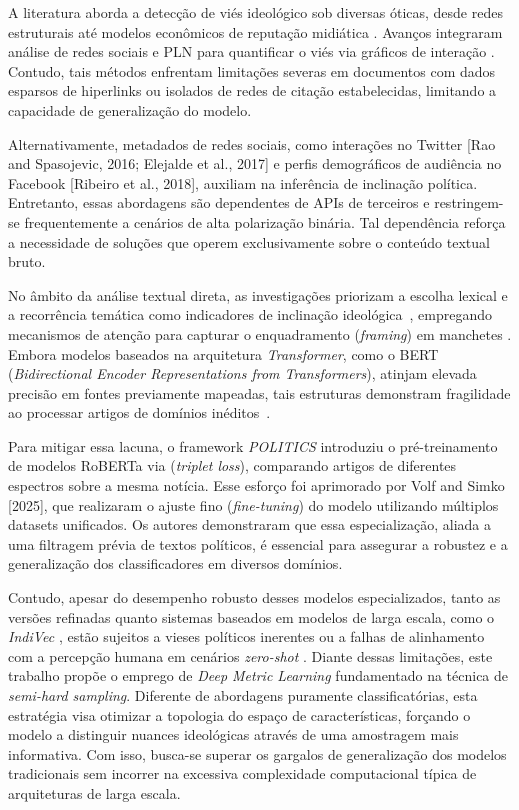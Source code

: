 A literatura aborda a detecção de viés ideológico sob diversas óticas, desde redes estruturais \cite{efron2004liberal} até modelos econômicos de reputação midiática \cite{gentzkow2006media}. 
Avanços integraram análise de redes sociais e PLN para quantificar o viés via gráficos de interação \cite{lin2011more}. Contudo, tais métodos enfrentam limitações severas em documentos com 
dados esparsos de hiperlinks ou isolados de redes de citação estabelecidas, limitando a capacidade de generalização do modelo.

Alternativamente, metadados de redes sociais, como interações no Twitter [Rao and Spasojevic, 2016; Elejalde et al., 2017] e perfis demográficos de audiência no Facebook [Ribeiro et al., 2018], 
auxiliam na inferência de inclinação política. Entretanto, essas abordagens são dependentes de APIs de terceiros e restringem-se frequentemente a cenários de alta polarização binária.
Tal dependência reforça a necessidade de soluções que operem exclusivamente sobre o conteúdo textual bruto.

No âmbito da análise textual direta, as investigações priorizam a escolha lexical e a recorrência temática como indicadores de inclinação ideológica~\cite{dallmann2015media}, empregando mecanismos 
de atenção para capturar o enquadramento (\textit{framing}) em manchetes \cite{gangula-etal-2019-detecting}. Embora modelos baseados na arquitetura \textit{Transformer}, como o BERT (\textit{Bidirectional Encoder Representations from Transformers}), 
atinjam elevada precisão em fontes previamente mapeadas, tais estruturas demonstram fragilidade ao processar artigos de domínios inéditos~\cite{baly2020we}.

Para mitigar essa lacuna, o framework \textit{POLITICS} \cite{liu-etal-2022-politics} introduziu o pré-treinamento de modelos RoBERTa via (\textit{triplet loss}), comparando artigos de diferentes espectros sobre a mesma notícia. 
Esse esforço foi aprimorado por Volf and Simko [2025], que realizaram o ajuste fino (\textit{fine-tuning}) do modelo utilizando múltiplos datasets unificados. Os autores demonstraram que essa especialização, aliada a 
uma filtragem prévia de textos políticos, é essencial para assegurar a robustez e a generalização dos classificadores em diversos domínios.

Contudo, apesar do desempenho robusto desses modelos especializados, tanto as versões refinadas quanto sistemas baseados em modelos de larga escala, como o \textit{IndiVec} \cite{lin2024indivec}, estão sujeitos a vieses políticos inerentes ou a falhas de alinhamento com a percepção humana 
em cenários \textit{zero-shot} \cite{lin-etal-2025-investigating}. Diante dessas limitações, este trabalho propõe o emprego de \textit{Deep Metric Learning} fundamentado na técnica de \textit{semi-hard sampling}. Diferente de abordagens puramente classificatórias, esta estratégia visa otimizar 
a topologia do espaço de características, forçando o modelo a distinguir nuances ideológicas através de uma amostragem mais informativa. Com isso, busca-se superar os gargalos de generalização dos modelos tradicionais sem incorrer na excessiva complexidade computacional típica de 
arquiteturas de larga escala.
